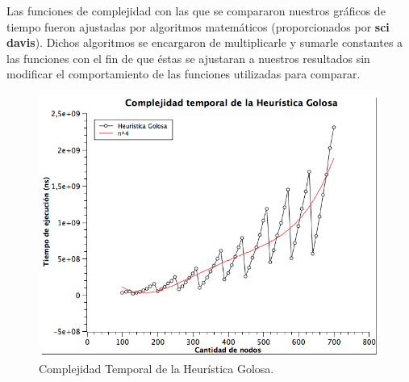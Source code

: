 Las funciones de complejidad con las que se compararon nuestros gráficos de tiempo fueron ajustadas por algoritmos matemáticos (proporcionados por \textbf{sci davis}). Dichos algoritmos se encargaron de multiplicarle y sumarle constantes a las funciones con el fin de que éstas se ajustaran a nuestros resultados sin modificar el comportamiento de las funciones utilizadas para comparar.

\begin{figure}[H] %
\begin{center}
\includegraphics[width=350pt]{../imgs/complejidad_goloso.png}
\caption{Complejidad Temporal de la Heurística Golosa.}
\end{center}
\end{figure}

